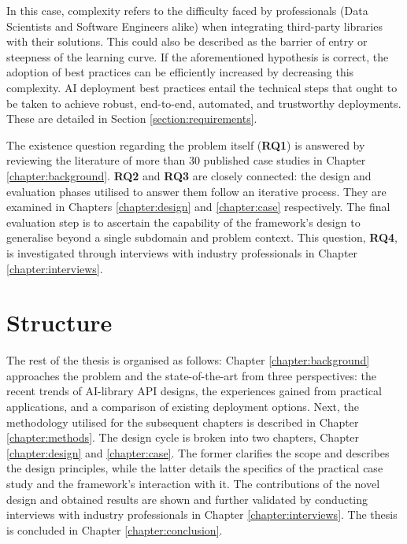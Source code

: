 In this case, complexity refers to the difficulty faced by professionals (Data Scientists and Software Engineers alike) when integrating third-party libraries with their solutions. This could also be described as the barrier of entry or steepness of the learning curve. If the aforementioned hypothesis is correct, the adoption of best practices can be efficiently increased by decreasing this complexity. AI deployment best practices entail the technical steps that ought to be taken to achieve robust, end-to-end, automated, and trustworthy deployments. These are detailed in Section \ref{section:requirements}.

The existence question regarding the problem itself (\textbf{RQ1}) is answered by reviewing the literature of more than 30 published case studies in Chapter \ref{chapter:background}. \textbf{RQ2} and \textbf{RQ3} are closely connected: the design and evaluation phases utilised to answer them follow an iterative process. They are examined in Chapters \ref{chapter:design} and \ref{chapter:case} respectively. The final evaluation step is to ascertain the capability of the framework's design to generalise beyond a single subdomain and problem context. This question, \textbf{RQ4}, is investigated through interviews with industry professionals in Chapter \ref{chapter:interviews}.

\section{Structure}

The rest of the thesis is organised as follows: Chapter \ref{chapter:background} approaches the problem and the state-of-the-art from three perspectives: the recent trends of AI-library API designs, the experiences gained from practical applications, and a comparison of existing deployment options. Next, the methodology utilised for the subsequent chapters is described in Chapter \ref{chapter:methods}. The design cycle is broken into two chapters, Chapter \ref{chapter:design} and \ref{chapter:case}. The former clarifies the scope and describes the design principles, while the latter details the specifics of the practical case study and the framework's interaction with it. The contributions of the novel design and obtained results are shown and further validated by conducting interviews with industry professionals in Chapter \ref{chapter:interviews}. The thesis is concluded in Chapter \ref{chapter:conclusion}.
